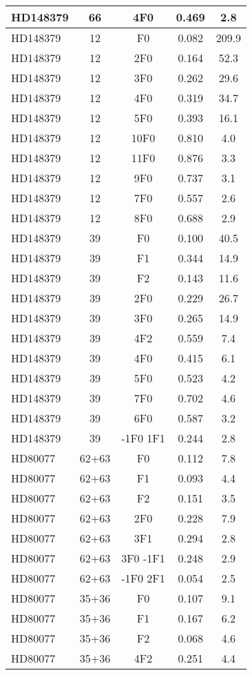 \begin{table*}
\begin{tabular}{l c c c c}
HD148379 & 66 & 4F0 & 0.469 & 2.8\\ 
\hline
HD148379 & 12 & F0 & 0.082 & 209.9\\ 
HD148379 & 12 & 2F0 & 0.164 & 52.3\\ 
HD148379 & 12 & 3F0 & 0.262 & 29.6\\ 
HD148379 & 12 & 4F0 & 0.319 & 34.7\\ 
HD148379 & 12 & 5F0 & 0.393 & 16.1\\ 
HD148379 & 12 & 10F0 & 0.810 & 4.0\\ 
HD148379 & 12 & 11F0 & 0.876 & 3.3\\ 
HD148379 & 12 & 9F0 & 0.737 & 3.1\\ 
HD148379 & 12 & 7F0 & 0.557 & 2.6\\ 
HD148379 & 12 & 8F0 & 0.688 & 2.9\\ 
\hline
HD148379 & 39 & F0 & 0.100 & 40.5\\ 
HD148379 & 39 & F1 & 0.344 & 14.9\\ 
HD148379 & 39 & F2 & 0.143 & 11.6\\ 
HD148379 & 39 & 2F0 & 0.229 & 26.7\\ 
HD148379 & 39 & 3F0 & 0.265 & 14.9\\ 
HD148379 & 39 & 4F2 & 0.559 & 7.4\\ 
HD148379 & 39 & 4F0 & 0.415 & 6.1\\ 
HD148379 & 39 & 5F0 & 0.523 & 4.2\\ 
HD148379 & 39 & 7F0 & 0.702 & 4.6\\ 
HD148379 & 39 & 6F0 & 0.587 & 3.2\\ 
HD148379 & 39 & -1F0 1F1 & 0.244 & 2.8\\ 
\hline
HD80077 & 62+63 & F0 & 0.112 & 7.8\\ 
HD80077 & 62+63 & F1 & 0.093 & 4.4\\ 
HD80077 & 62+63 & F2 & 0.151 & 3.5\\ 
HD80077 & 62+63 & 2F0 & 0.228 & 7.9\\ 
HD80077 & 62+63 & 3F1 & 0.294 & 2.8\\ 
HD80077 & 62+63 & 3F0 -1F1 & 0.248 & 2.9\\ 
HD80077 & 62+63 & -1F0 2F1 & 0.054 & 2.5\\ 
\hline
HD80077 & 35+36 & F0 & 0.107 & 9.1\\ 
HD80077 & 35+36 & F1 & 0.167 & 6.2\\ 
HD80077 & 35+36 & F2 & 0.068 & 4.6\\ 
HD80077 & 35+36 & 4F2 & 0.251 & 4.4\\ 

\end{tabular}
\end{table*}
